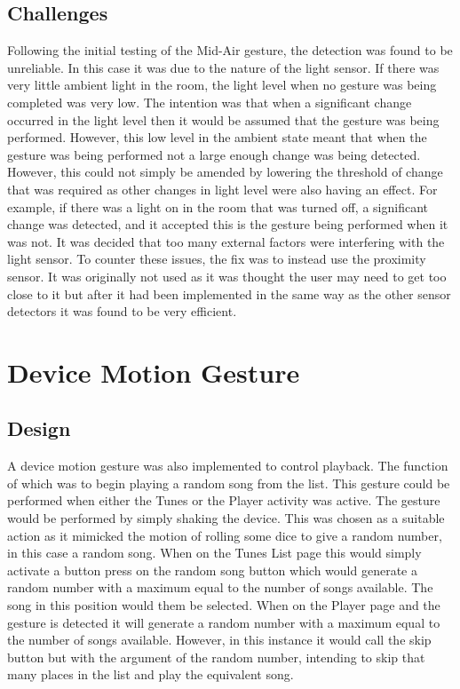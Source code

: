 \documentclass{l4proj}
\begin{document}
\subsection{Challenges}
Following the initial testing of the Mid-Air gesture, the detection was found to be unreliable. In this case it was due to the nature of the light sensor. If there was very little ambient light in the room, the light level when no gesture was being completed was very low. The intention was that when a significant change occurred in the light level then it would be assumed that the gesture was being performed. However, this low level in the ambient state meant that when the gesture was being performed not a large enough change was being detected. However, this could not simply be amended by lowering the threshold of change that was required as other changes in light level were also having an effect. For example, if there was a light on in the room that was turned off, a significant change was detected, and it accepted this is the gesture being performed when it was not. It was decided that too many external factors were interfering with the light sensor. To counter these issues, the fix was to instead use the proximity sensor. It was originally not used as it was thought the user may need to get too close to it but after it had been implemented in the same way as the other sensor detectors it was found to be very efficient.

\section{Device Motion Gesture }

\subsection{Design}
A device motion gesture was also implemented to control playback. The function of which was to begin playing a random song from the list. This gesture could be performed when either the Tunes or the Player activity was active. The gesture would be performed by simply shaking the device. This was chosen as a suitable action as it mimicked the motion of rolling some dice to give a random number, in this case a random song. When on the Tunes List page this would simply activate a button press on the random song button which would generate a random number with a maximum equal to the number of songs available. The song in this position would them be selected. When on the Player page and the gesture is detected it will generate a random number with a maximum equal to the number of songs available. However, in this instance it would call the skip button but with the argument of the random number, intending to skip that many places in the list and play the equivalent song.
\end{document}
